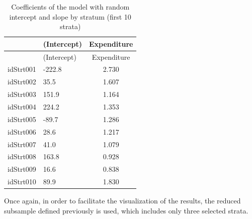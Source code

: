 \documentclass[
  english,
  12pt,
]{book}
\newenvironment{Shaded}{\begin{snugshade}}{\end{snugshade}}
\newcommand{\AttributeTok}[1]{\textcolor[rgb]{0.13,0.29,0.53}{#1}}
\newcommand{\DataTypeTok}[1]{\textcolor[rgb]{0.13,0.29,0.53}{#1}}
\newcommand{\DecValTok}[1]{\textcolor[rgb]{0.00,0.00,0.81}{#1}}
\newcommand{\FunctionTok}[1]{\textcolor[rgb]{0.13,0.29,0.53}{\textbf{#1}}}
\newcommand{\NormalTok}[1]{#1}
\newcommand{\OtherTok}[1]{\textcolor[rgb]{0.56,0.35,0.01}{#1}}
\newcommand{\SpecialCharTok}[1]{\textcolor[rgb]{0.81,0.36,0.00}{\textbf{#1}}}
\newcommand{\StringTok}[1]{\textcolor[rgb]{0.31,0.60,0.02}{#1}}
\begin{document}
\begin{Shaded}
\end{Shaded}

\begin{longtable}[]{@{}llc@{}}
\caption{\label{tab:tab-coef-pendiente-aleatoria}Coefficients of the model with random intercept and slope by stratum (first 10 strata)}\tabularnewline
\toprule\noalign{}
& (Intercept) & Expenditure \\
\midrule\noalign{}
\endfirsthead
\toprule\noalign{}
& (Intercept) & Expenditure \\
\midrule\noalign{}
\endhead
\bottomrule\noalign{}
\endlastfoot
idStrt001 & -222.8 & 2.730 \\
idStrt002 & 35.5 & 1.607 \\
idStrt003 & 151.9 & 1.164 \\
idStrt004 & 224.2 & 1.353 \\
idStrt005 & -89.7 & 1.286 \\
idStrt006 & 28.6 & 1.217 \\
idStrt007 & 41.0 & 1.079 \\
idStrt008 & 163.8 & 0.928 \\
idStrt009 & 16.6 & 0.838 \\
idStrt010 & 89.9 & 1.830 \\
\end{longtable}

Once again, in order to facilitate the visualization of the results, the reduced subsample defined previously is used, which includes only three selected strata.

\begin{Shaded}
\end{Shaded}
\end{document}

